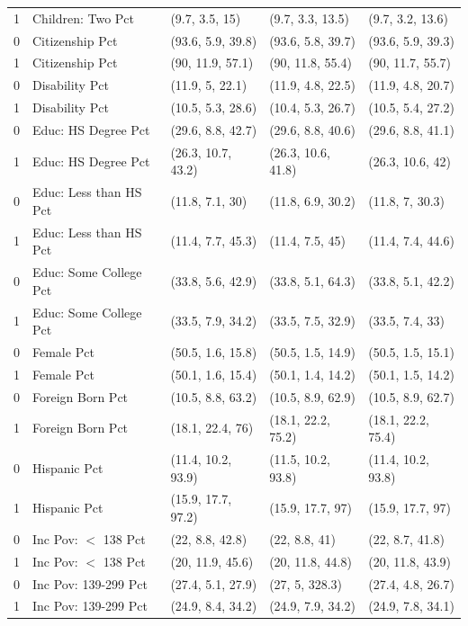 \begin{table}[h!]
\begin{tabular}{rllll}
  1 & Children: Two Pct & (9.7, 3.5, 15) & (9.7, 3.3, 13.5) & (9.7, 3.2, 13.6) \\ 
  0 & Citizenship Pct & (93.6, 5.9, 39.8) & (93.6, 5.8, 39.7) & (93.6, 5.9, 39.3) \\ 
  1 & Citizenship Pct & (90, 11.9, 57.1) & (90, 11.8, 55.4) & (90, 11.7, 55.7) \\ 
  0 & Disability Pct & (11.9, 5, 22.1) & (11.9, 4.8, 22.5) & (11.9, 4.8, 20.7) \\ 
  1 & Disability Pct & (10.5, 5.3, 28.6) & (10.4, 5.3, 26.7) & (10.5, 5.4, 27.2) \\ 
  0 & Educ: HS Degree Pct & (29.6, 8.8, 42.7) & (29.6, 8.8, 40.6) & (29.6, 8.8, 41.1) \\ 
  1 & Educ: HS Degree Pct & (26.3, 10.7, 43.2) & (26.3, 10.6, 41.8) & (26.3, 10.6, 42) \\ 
  0 & Educ: Less than HS Pct & (11.8, 7.1, 30) & (11.8, 6.9, 30.2) & (11.8, 7, 30.3) \\ 
  1 & Educ: Less than HS Pct & (11.4, 7.7, 45.3) & (11.4, 7.5, 45) & (11.4, 7.4, 44.6) \\ 
  0 & Educ: Some College Pct & (33.8, 5.6, 42.9) & (33.8, 5.1, 64.3) & (33.8, 5.1, 42.2) \\ 
  1 & Educ: Some College Pct & (33.5, 7.9, 34.2) & (33.5, 7.5, 32.9) & (33.5, 7.4, 33) \\ 
  0 & Female Pct & (50.5, 1.6, 15.8) & (50.5, 1.5, 14.9) & (50.5, 1.5, 15.1) \\ 
  1 & Female Pct & (50.1, 1.6, 15.4) & (50.1, 1.4, 14.2) & (50.1, 1.5, 14.2) \\ 
  0 & Foreign Born Pct & (10.5, 8.8, 63.2) & (10.5, 8.9, 62.9) & (10.5, 8.9, 62.7) \\ 
  1 & Foreign Born Pct & (18.1, 22.4, 76) & (18.1, 22.2, 75.2) & (18.1, 22.2, 75.4) \\ 
  0 & Hispanic Pct & (11.4, 10.2, 93.9) & (11.5, 10.2, 93.8) & (11.4, 10.2, 93.8) \\ 
  1 & Hispanic Pct & (15.9, 17.7, 97.2) & (15.9, 17.7, 97) & (15.9, 17.7, 97) \\ 
  0 & Inc Pov: $<$ 138 Pct & (22, 8.8, 42.8) & (22, 8.8, 41) & (22, 8.7, 41.8) \\ 
  1 & Inc Pov: $<$ 138 Pct & (20, 11.9, 45.6) & (20, 11.8, 44.8) & (20, 11.8, 43.9) \\ 
  0 & Inc Pov: 139-299 Pct & (27.4, 5.1, 27.9) & (27, 5, 328.3) & (27.4, 4.8, 26.7) \\ 
  1 & Inc Pov: 139-299 Pct & (24.9, 8.4, 34.2) & (24.9, 7.9, 34.2) & (24.9, 7.8, 34.1) \\ 

\end{tabular}
\end{table}
